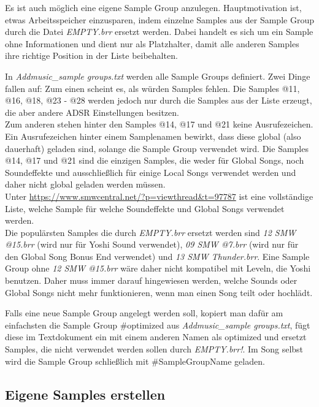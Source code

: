 Es ist auch möglich eine eigene Sample Group anzulegen. Hauptmotivation ist, etwas Arbeitsspeicher einzusparen, indem einzelne Samples aus der Sample Group durch die Datei \textit{EMPTY.brr} ersetzt werden. Dabei handelt es sich um ein Sample ohne Informationen und dient nur als Platzhalter, damit alle anderen Samples ihre richtige Position in der Liste beibehalten.

\bigskip

In \textit{Addmusic\_sample groups.txt} werden alle Sample Groups definiert. Zwei Dinge fallen auf: Zum einen scheint es, als würden Samples fehlen. Die Samples @11, @16, @18, @23 - @28 werden jedoch nur durch die Samples aus der Liste erzeugt, die aber andere ADSR Einstellungen besitzen. \\

Zum anderen stehen hinter den Samples @14, @17 und @21 keine Ausrufezeichen. Ein Ausrufezeichen hinter einem Samplenamen bewirkt, dass diese global (also dauerhaft) geladen sind, solange die Sample Group verwendet wird. Die Samples @14, @17 und @21 sind die einzigen Samples, die weder für Global Songs, noch Soundeffekte und ausschließlich für einige Local Songs verwendet werden und daher nicht global geladen werden müssen. \\
Unter \href{https://www.smwcentral.net/?p=viewthread\&t=97787}{https://www.smwcentral.net/?p=viewthread\&t=97787} ist eine vollständige Liste, welche Sample für welche Soundeffekte und Global Songs verwendet werden. \\
Die populärsten Samples die durch \textit{EMPTY.brr} ersetzt werden sind \textit{12 SMW @15.brr} (wird nur für Yoshi Sound verwendet), \textit{09 SMW @7.brr} (wird nur für den Global Song Bonus End verwendet) und \textit{13 SMW Thunder.brr}. Eine Sample Group ohne \textit{12 SMW @15.brr} wäre daher nicht kompatibel mit Leveln, die Yoshi benutzen. Daher muss immer darauf hingewiesen werden, welche Sounds oder Global Songs nicht mehr funktionieren, wenn man einen Song teilt oder hochlädt.

\bigskip

Falls eine neue Sample Group angelegt werden soll, kopiert man dafür am einfachsten die Sample Group \#optimized aus \textit{Addmusic\_sample groups.txt}, fügt diese im Textdokument ein mit einem anderen Namen als optimized und ersetzt Samples, die nicht verwendet werden sollen durch \textit{\dq EMPTY.brr\dq{}!}. Im Song selbst wird die Sample Group schließlich mit \#SampleGroupName geladen.

\subsection{Eigene Samples erstellen}
